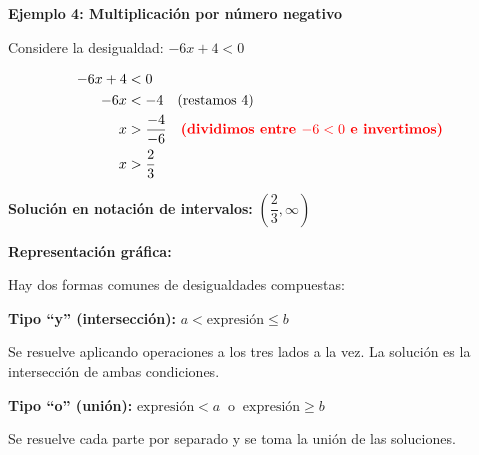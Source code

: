 \begin{example}
\textbf{Ejemplo 4: Multiplicación por número negativo}

Considere la desigualdad: $-6x + 4 < 0$

\solution
\begin{align*}
-6x + 4 &< 0 \\
-6x &< -4 \quad \text{(restamos 4)} \\
x &> \dfrac{-4}{-6} \quad \textcolor{red}{\textbf{(dividimos entre $-6 < 0$ e invertimos)}} \\
x &> \dfrac{2}{3}
\end{align*}

\textbf{Solución en notación de intervalos:} $\left(\dfrac{2}{3}, \infty\right)$

\textbf{Representación gráfica:}

\begin{center}
\end{center}
\end{example}

\newpage


Hay dos formas comunes de desigualdades compuestas:

\begin{definition}
\textbf{Tipo ``y'' (intersección):} $a < \text{expresión} \le b$

Se resuelve aplicando operaciones a los tres lados a la vez. La solución es la intersección de ambas condiciones.

\textbf{Tipo ``o'' (unión):} $\text{expresión} < a \;\;\text{o}\;\; \text{expresión} \ge b$

Se resuelve cada parte por separado y se toma la unión de las soluciones.
\end{definition}

